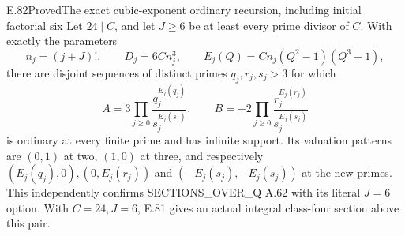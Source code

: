 \begin{result}{E.82}{Proved}{The exact cubic-exponent ordinary recursion, including initial factorial six}
Let $24\mid C$, and let $J\geq6$ be at least every prime
divisor of $C$. With exactly the parameters
\[
 n_j=(j+J)!,\qquad D_j=6Cn_j^3,\qquad
 E_j(Q)=Cn_j(Q^2-1)(Q^3-1),
 \tag{E.82.1}
\]
there are disjoint sequences of distinct primes $q_j,r_j,s_j>3$
for which
\[
 A=3\prod_{j\geq0}\frac{q_j^{E_j(q_j)}}{s_j^{E_j(s_j)}},
 \qquad
 B=-2\prod_{j\geq0}\frac{r_j^{E_j(r_j)}}{s_j^{E_j(s_j)}}
 \tag{E.82.2}
\]
is ordinary at every finite prime and has infinite support.
Its valuation patterns are $(0,1)$ at two, $(1,0)$ at three,
and respectively $(E_j(q_j),0),(0,E_j(r_j))$ and
$(-E_j(s_j),-E_j(s_j))$ at the new primes.
This independently confirms SECTIONS\_OVER\_Q A.62 with its
literal $J=6$ option. With $C=24,J=6$, E.81 gives an actual
integral class-four section above this pair.
\end{result}
